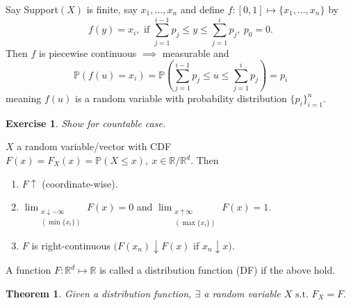 \documentclass{article}
\newcommand{\1}{\mathds{1}}
\newcommand{\R}{\mathbb{R}}
\newcommand{\PB}{\mathbb{P}}
\newcommand{\st}{\text{ s.t. }}
\newtheorem{theorem}{Theorem}[section]
\newtheorem{exercise}{Exercise}
\begin{document}
    Say Support$(X)$ is finite, say $x_1,\ldots,x_n$ and define $f:[0,1]\mapsto \{x_1,\ldots,x_n\}$ by $$f(y)=x_i,\text{ if }\sum_{j=1}^{i-1}p_j\leq y\leq \sum_{j=1}^ip_j,\ p_0=0.$$ Then $f$ is piecewise continuous $\implies$ measurable and $$\PB(f(u)=x_i)=\PB(\sum_{j=1}^{i-1}p_j\leq u\leq \sum_{j=1}^ip_j)=p_i$$ meaning $f(u)$ is a random variable with probability distribution $\{p_i\}_{i=1}^n.$
    \begin{exercise}
        Show for countable case.
    \end{exercise}
$X$ a random variable/vector with CDF $F(x)=F_X(x)=\PB(X\leq x),\ x\in\R/\R^d.$ Then
\begin{enumerate}
    \item $F\uparrow$ (coordinate-wise).
    \item $\lim_{\substack{x\downarrow -\infty\\(\min\{x_i\})}}F(x)=0$ and $\lim_{\substack{x\uparrow \infty\\(\max\{x_i\})}}F(x)=1.$
    \item $F$ is right-continuous $(F(x_n)\downarrow F(x)$ if $x_n\downarrow x).$
\end{enumerate}
A function $F:\R^d\mapsto\R$ is called a distribution function (DF) if the above hold.
\begin{theorem}
    Given a distribution function, $\exists$ a random variable $X\st F_X=F.$ 
\end{theorem}
\end{document}
